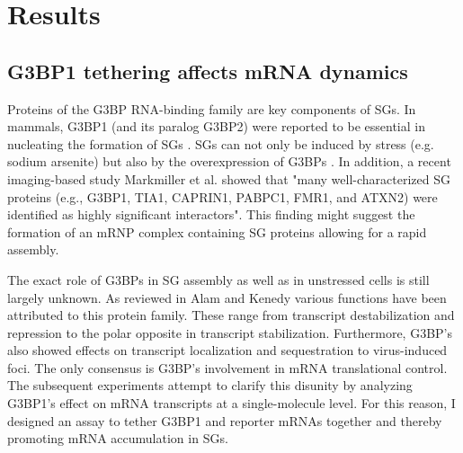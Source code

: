 \chapter{Results}


\section{G3BP1 tethering affects mRNA dynamics}

Proteins of the G3BP RNA-binding family are key components of SGs.
In mammals, G3BP1 (and its paralog G3BP2) were reported to be essential in nucleating the formation of SGs \cite{kedersha_g3bp-caprin1-usp10_2016}.
SGs can not only be induced by stress (e.g. sodium arsenite) but also by the overexpression of G3BPs \cite{tourriere_rasgap-associated_2003}.
In addition, a recent imaging-based study Markmiller et al. \cite{markmiller_context-dependent_2018} showed that "many well-characterized SG proteins (e.g., G3BP1, TIA1, CAPRIN1, PABPC1, FMR1, and ATXN2) were identified as highly significant interactors".
This finding might suggest the formation of an mRNP complex containing SG proteins allowing for a rapid assembly.

The exact role of G3BPs in SG assembly as well as in unstressed cells is still largely unknown.
As reviewed in Alam and Kenedy \cite{alam_rasputin_2019} various functions have been attributed to this protein family.
These range from transcript destabilization and repression to the polar opposite in transcript stabilization.
Furthermore, G3BP's also showed effects on transcript localization and sequestration to virus-induced foci.
The only consensus is G3BP's involvement in mRNA translational control.
The subsequent experiments attempt to clarify this disunity by analyzing G3BP1's effect on mRNA transcripts at a single-molecule level.
For this reason, I designed an assay to tether G3BP1 and reporter mRNAs together and thereby promoting mRNA accumulation in SGs.


